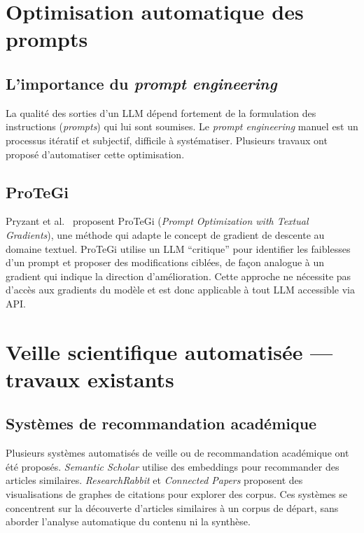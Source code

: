 \section{Optimisation automatique des prompts}

\subsection{L'importance du \textit{prompt engineering}}

La qualité des sorties d'un LLM dépend fortement de la formulation des
instructions (\textit{prompts}) qui lui sont soumises. Le \textit{prompt
engineering} manuel est un processus itératif et subjectif, difficile à
systématiser. Plusieurs travaux ont proposé d'automatiser cette optimisation.

\subsection{ProTeGi}

Pryzant et al.\ \cite{pryzant2023automatic} proposent ProTeGi
(\textit{Prompt Optimization with Textual Gradients}), une méthode qui
adapte le concept de gradient de descente au domaine textuel. ProTeGi
utilise un LLM ``critique'' pour identifier les faiblesses d'un prompt
et proposer des modifications ciblées, de façon analogue à un gradient
qui indique la direction d'amélioration. Cette approche ne nécessite
pas d'accès aux gradients du modèle et est donc applicable à tout LLM
accessible via API.

\section{Veille scientifique automatisée — travaux existants}

\subsection{Systèmes de recommandation académique}

Plusieurs systèmes automatisés de veille ou de recommandation académique
ont été proposés. \textit{Semantic Scholar} \cite{lo2020s2orc} utilise des
embeddings pour recommander des articles similaires. \textit{ResearchRabbit}
et \textit{Connected Papers} proposent des visualisations de graphes de
citations pour explorer des corpus. Ces systèmes se concentrent sur la
découverte d'articles similaires à un corpus de départ, sans aborder
l'analyse automatique du contenu ni la synthèse.

